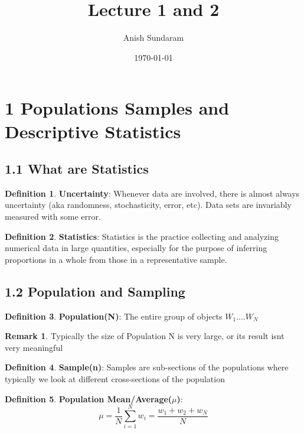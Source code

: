 \documentclass[12pt]{amsart}
\title{Lecture 1 and 2}
\author{Anish Sundaram}
\date{\today}
\theoremstyle{definition}
\newtheorem{definition}{Definition} %
\newtheorem*{remark}{Remark}        %
\numberwithin{equation}{theorem}    %
\begin{document}
\maketitle

\tableofcontents

\section*{1 Populations Samples and Descriptive Statistics}

\subsection*{1.1 What are Statistics}
\begin{definition}
    \textbf{Uncertainty}:
    Whenever data are involved, there is almost always uncertainty (aka randomness, stochasticity, error, etc). Data sets are invariably measured with some error.
\end{definition}

\begin{definition}
    \textbf{Statistics}:
    Statistics is the practice  collecting and analyzing numerical data in large quantities, especially for the purpose of inferring proportions in a whole from those in a representative sample.
\end{definition}

\subsection*{1.2 Population and Sampling}
\begin{definition}
    \textbf{Population(N)}:
    The entire group of objects {$W_1 ....W_N$}
    \begin{remark}
        Typically the size of Population N is very large, or its result isnt very meaningful
    \end{remark}
\end{definition}

\begin{definition}
    \textbf{Sample(n)}:
    Samples are sub-sections of the populations where typically we look at different cross-sections of the population
\end{definition}

\begin{definition}
    \textbf{Population Mean/Average($\mu$)}:
    $$\mu = \frac{1}{N} \sum _{i=1}^{N} w_i = \frac{w_1 + w_2 +w_N}{N}$$
\end{definition}
\end{document}
